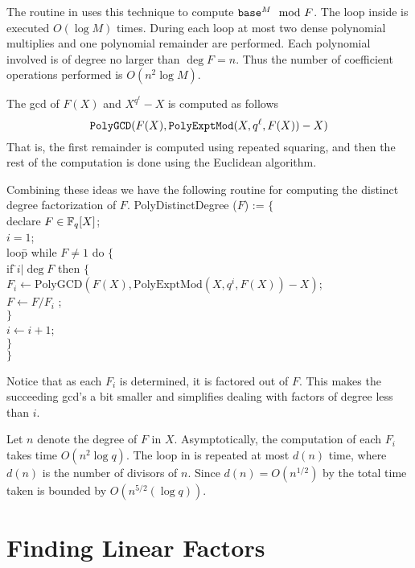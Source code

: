 The routine  in  uses
this technique to compute $\mbox{\tt base}^M
\mod{F}$.  The loop
inside  is executed $O(\log M)$ times.  During each
loop at most two dense polynomial multiplies and one polynomial
remainder are performed.  Each polynomial involved is of degree no
larger than $\deg F = n$.  Thus the number of coefficient operations
performed is $O(n^2 \log M)$.

The {\sc gcd} of $F(X)$ and $X^{q^\ell} -X$ is computed as follows
\[
\mbox{\tt PolyGCD}(F(X), \mbox{\tt PolyExptMod}(X, q^{\ell}, F(X)) - X)
\]
That is, the first remainder is computed using repeated squaring, and
then the rest of the computation is done using the Euclidean algorithm.

Combining these ideas we have the following routine for computing the
distinct degree factorization of $F$.
\begindsacode
PolyDistinctDegree ($F$) := $\{$ \\
\> declare $F \in \mathbb{F}_q[X]$; \\
\> $i = 1$; \\
\> loo\=p while $F \not= 1$ do $\{$ \\
\>\> if \=$i | \deg F$ then $\{$ \\
\>\>\> $F_i \leftarrow
      \mbox{PolyGCD}(F(X), \mbox{PolyExptMod}(X, q^i, F(X)) - X)$;\\
\>\>\> $F \leftarrow F/F_i$ ; \\
\>\>\> $\}$ \\
\>\> $i \leftarrow i + 1$;\\
\>\> $\}$ \\
\> $\}$
\enddsacode

\noindent
Notice that  as each $F_i$ is determined, it is factored out of $F$.
This makes the succeeding {\sc gcd}'s a bit smaller and simplifies dealing
with factors of degree less than $i$.  

Let $n$ denote the degree of $F$ in $X$.  Asymptotically, the 
computation of each $F_i$ takes time $O(n^2 \log q)$.  The loop in
 is repeated at most $d(n)$ time, where
$d(n)$ is the number of divisors of $n$.  Since $d(n) = O(n^{1/2})$ by
 the total time taken is bounded by
$O(n^{5/2}(\log q))$.

\section{Finding Linear Factors}
\label{FFac:Linear:Sec}


